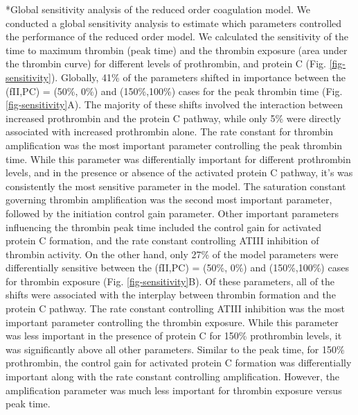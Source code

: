 \documentclass[12pt]{article}
\makeatletter
\renewcommand\subsection{\@startsection
	{subsection}{2}{0mm}
	{-0.05in}
	{-0.5\baselineskip}
	{\normalfont\normalsize\bfseries}}
\makeatother
\begin{document}
\subsection*{Global sensitivity analysis of the reduced order coagulation model.}
We conducted a global sensitivity analysis to estimate which parameters controlled the performance of the reduced order model. 
We calculated the sensitivity of the time to maximum thrombin (peak time) and the thrombin exposure (area under the thrombin curve) 
for different levels of prothrombin, and protein C (Fig. \ref{fig-sensitivity}). 
Globally, 41\% of the parameters shifted in importance between the (fII,PC) = (50\%, 0\%) and (150\%,100\%) cases for the peak thrombin time (Fig. \ref{fig-sensitivity}A). 
The majority of these shifts involved the interaction between increased prothrombin and the protein C pathway, while only
5\% were directly associated with increased prothrombin alone. The rate constant for thrombin amplification was the most important parameter controlling the
peak thrombin time. While this parameter was differentially important for different prothrombin levels, and in the presence or absence of 
the activated protein C pathway, it's was consistently the most sensitive parameter in the model. The saturation constant governing thrombin amplification was
the second most important parameter, followed by the initiation control gain parameter. Other important parameters influencing the thrombin peak time included the control gain for
activated protein C formation, and the rate constant controlling ATIII inhibition of thrombin activity. 
On the other hand, only 27\% of the model parameters were differentially sensitive between the (fII,PC) = (50\%, 0\%) and (150\%,100\%) cases 
for thrombin exposure (Fig. \ref{fig-sensitivity}B). Of these parameters, all of the shifts were associated with the interplay between thrombin formation and the protein C pathway. 
The rate constant controlling ATIII inhibition was the most important parameter controlling the thrombin exposure.
While this parameter was less important in the presence of protein C for 150\% prothrombin levels, it was significantly above all other parameters. 
Similar to the peak time, for 150\% prothrombin, the control gain for activated protein C formation was differentially important along with the rate constant controlling
amplification. However, the amplification parameter was much less important for thrombin exposure versus peak time. 

\clearpage
\end{document}
